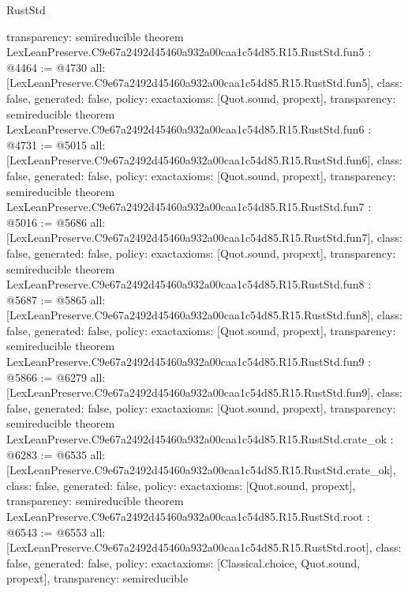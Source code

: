 \begin{lexlean}{RustStd}
\begin{coremodule}
{  transparency: semireducible
}
theorem LexLeanPreserve.C9e67a2492d45460a932a00caa1c54d85.R15.RustStd.fun5 : @4464 := @4730 {
  all: [LexLeanPreserve.C9e67a2492d45460a932a00caa1c54d85.R15.RustStd.fun5],
  class: false,
  generated: false,
  policy: exact{axioms: [Quot.sound, propext]},
  transparency: semireducible
}
theorem LexLeanPreserve.C9e67a2492d45460a932a00caa1c54d85.R15.RustStd.fun6 : @4731 := @5015 {
  all: [LexLeanPreserve.C9e67a2492d45460a932a00caa1c54d85.R15.RustStd.fun6],
  class: false,
  generated: false,
  policy: exact{axioms: [Quot.sound, propext]},
  transparency: semireducible
}
theorem LexLeanPreserve.C9e67a2492d45460a932a00caa1c54d85.R15.RustStd.fun7 : @5016 := @5686 {
  all: [LexLeanPreserve.C9e67a2492d45460a932a00caa1c54d85.R15.RustStd.fun7],
  class: false,
  generated: false,
  policy: exact{axioms: [Quot.sound, propext]},
  transparency: semireducible
}
theorem LexLeanPreserve.C9e67a2492d45460a932a00caa1c54d85.R15.RustStd.fun8 : @5687 := @5865 {
  all: [LexLeanPreserve.C9e67a2492d45460a932a00caa1c54d85.R15.RustStd.fun8],
  class: false,
  generated: false,
  policy: exact{axioms: [Quot.sound, propext]},
  transparency: semireducible
}
theorem LexLeanPreserve.C9e67a2492d45460a932a00caa1c54d85.R15.RustStd.fun9 : @5866 := @6279 {
  all: [LexLeanPreserve.C9e67a2492d45460a932a00caa1c54d85.R15.RustStd.fun9],
  class: false,
  generated: false,
  policy: exact{axioms: [Quot.sound, propext]},
  transparency: semireducible
}
theorem LexLeanPreserve.C9e67a2492d45460a932a00caa1c54d85.R15.RustStd.crate_ok : @6283 := @6535 {
  all: [LexLeanPreserve.C9e67a2492d45460a932a00caa1c54d85.R15.RustStd.crate_ok],
  class: false,
  generated: false,
  policy: exact{axioms: [Quot.sound, propext]},
  transparency: semireducible
}
theorem LexLeanPreserve.C9e67a2492d45460a932a00caa1c54d85.R15.RustStd.root : @6543 := @6553 {
  all: [LexLeanPreserve.C9e67a2492d45460a932a00caa1c54d85.R15.RustStd.root],
  class: false,
  generated: false,
  policy: exact{axioms: [Classical.choice, Quot.sound, propext]},
  transparency: semireducible
}


\end{coremodule}
\end{lexlean}
